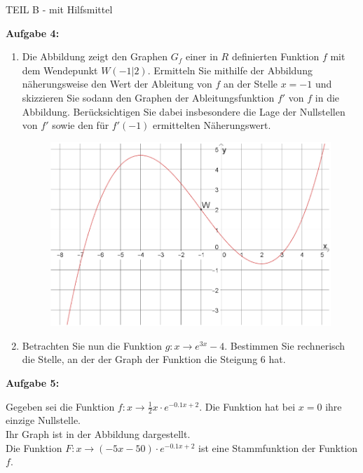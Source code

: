 \documentclass[a4paper,12pt]{article}
\newcommand{\Aufgabe}[1]{
  {
  \vspace*{0.5cm}
  \textsf{\textbf{Aufgabe #1}}
  \vspace*{0.2cm}
  
  }
}
\begin{document}
\newpage
{TEIL B} - mit Hilfsmittel

\Aufgabe{4:}


\begin{enumerate}[label={\alph*)}]
  \item Die Abbildung zeigt den Graphen $G_f$  einer in $R$ definierten Funktion $f$ mit dem Wendepunkt $W(-1|2)$. Ermitteln Sie mithilfe der Abbildung näherungsweise den Wert der Ableitung von $f$  an der Stelle $x=-1$  und skizzieren Sie sodann den Graphen der Ableitungsfunktion $f'$  von $f$  in die Abbildung. Berücksichtigen Sie dabei insbesondere die Lage der Nullstellen von $f'$  sowie den für $f'(-1)$ ermittelten Näherungswert.

  \begin{figure}[H]
    \centering
    \includegraphics[width=0.8\columnwidth]{210227_funkcja.png}
  \end{figure}

\item Betrachten Sie nun die Funktion $g: x\rightarrow e^{3x}-4$. Bestimmen Sie rechnerisch die Stelle, an der der Graph der Funktion die Steigung 6 hat.
\end{enumerate}


\Aufgabe{5:}
Gegeben sei die Funktion $f: x\rightarrow \frac{1}{2}x\cdot e^{-0.1x+2}$. Die Funktion hat bei $x=0$ ihre einzige Nullstelle.\\
Ihr Graph ist in der Abbildung dargestellt.\\
Die Funktion $F:x\rightarrow (-5x-50)\cdot e^{-0.1x+2}$ ist eine Stammfunktion der Funktion $f$.
\end{document}
